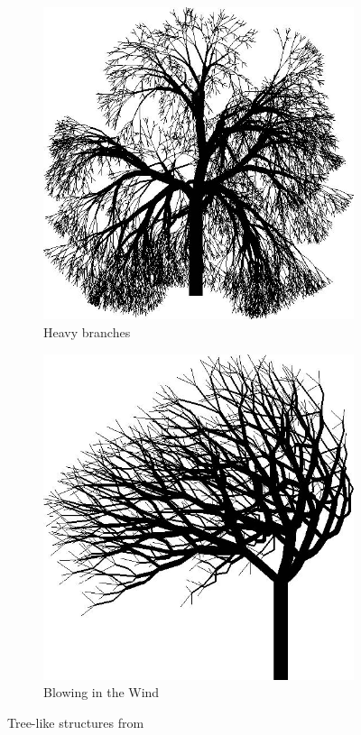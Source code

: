 \documentclass[12pt,twoside]{reedthesis}
\begin{document}
	\begin{figure}[h]
	\centering
	\begin{subfigure}{0.5\linewidth}
		\centering
		\includegraphics[width=\linewidth]{Images/newABOP1}
		\caption{Heavy branches}
		\label{HeavyBranches}
	\end{subfigure}%
	\begin{subfigure}{0.5\linewidth}
		\centering
		\includegraphics[width=\linewidth]{Images/newABOP2}
		\caption{Blowing in the Wind}
		\label{BlowingintheWind}
	\end{subfigure}
	\caption{Tree-like structures from \cite{ABOP1990}}
	\label{newABOP}
	\end{figure}
	
\end{document}
